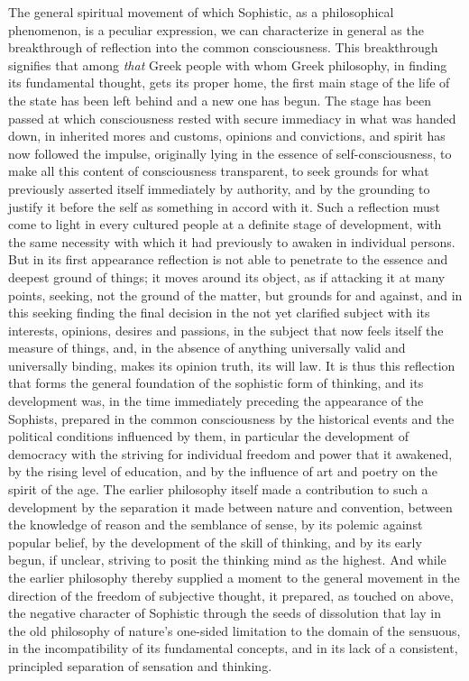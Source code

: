 The general spiritual movement of which Sophistic, as a philosophical
phenomenon, is a peculiar expression, we can characterize in general as the
breakthrough of reflection into the common consciousness. This breakthrough
signifies that among \emph{that} Greek people with whom Greek philosophy, in
finding its fundamental thought, gets its proper home, the first main stage
of the life of the state has been left behind and a new one has begun. The
stage has been passed at which consciousness rested with secure immediacy in
what was handed down, in inherited mores and customs, opinions and
convictions, and spirit has now followed the impulse, originally lying in the
essence of self-consciousness, to make all this content of consciousness
transparent, to seek grounds for what previously asserted itself immediately
by authority, and by the grounding to justify it before the self as something
in accord with it. Such a reflection must come to light in every cultured
people at a definite stage of development, with the same necessity with which
it had previously to awaken in individual persons. But in its first
appearance reflection is not able to penetrate to the essence and deepest
ground of things; it moves around its object, as if attacking it at many
points, seeking, not the ground of the matter, but grounds for and against,
and in this seeking finding the final decision in the not yet clarified
subject with its interests, opinions, desires and passions, in the subject
that now feels itself the measure of things, and, in the absence of anything
universally valid and universally binding, makes its opinion truth, its will
law. It is thus this reflection that forms the general foundation of the
sophistic form of thinking, and its development was, in the time immediately
preceding the appearance of the Sophists, prepared in the common
consciousness by the historical events and the political conditions
influenced by them, in particular the development of democracy with the
striving for individual freedom and power that it awakened, by the rising
level of education, and by the influence of art and poetry on the spirit of
the age. The earlier philosophy itself made a contribution to such a
development by the separation it made between nature and convention, between
the knowledge of reason and the semblance of sense, by its polemic against
popular belief, by the development of the skill of thinking, and by its early
begun, if unclear, striving to posit the thinking mind as the highest. And
while the earlier philosophy thereby supplied a moment to the general
movement in the direction of the freedom of subjective thought, it prepared,
as touched on above, the negative character of Sophistic through the seeds of
dissolution that lay in the old philosophy of nature's one-sided limitation
to the domain of the sensuous, in the incompatibility of its fundamental
concepts, and in its lack of a consistent, principled separation of sensation
and thinking.

